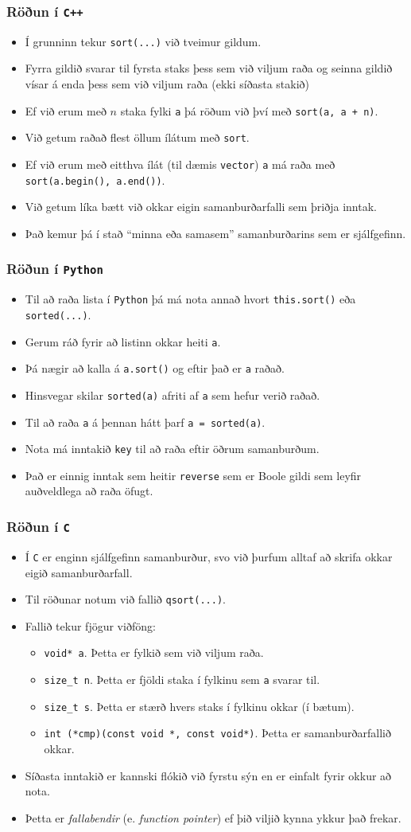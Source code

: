 \documentclass[handout]{beamer}
\newcommand\env[2]
{
	\begin{#1}
	#2
	\end{#1}
}
\begin{document}
\env{frame}
{
	\frametitle{Röðun í \texttt{C++}}
	\env{itemize}
	{
		\item<1-> Í grunninn tekur \texttt{sort(...)} við tveimur gildum.
		\item<2-> Fyrra gildið svarar til fyrsta staks þess sem við viljum raða og seinna gildið vísar á enda þess sem við viljum raða
			(ekki síðasta stakið)
		\item<3-> Ef við erum með $n$ staka fylki \texttt{a} þá röðum við því með \texttt{sort(a, a + n)}.
		\item<4-> Við getum raðað flest öllum ílátum með \texttt{sort}.
		\item<5-> Ef við erum með eitthva ílát (til dæmis \texttt{vector}) \texttt{a} má raða með \texttt{sort(a.begin(), a.end())}.
		\item<6-> Við getum líka bætt við okkar eigin samanburðarfalli sem þriðja inntak.
		\item<7-> Það kemur þá í stað ``minna eða samasem'' samanburðarins sem er sjálfgefinn.
	}
}

\env{frame}
{
	\frametitle{Röðun í \texttt{Python}}
	\env{itemize}
	{
		\item<1-> Til að raða lista í \texttt{Python} þá má nota annað hvort \texttt{this.sort()} eða \texttt{sorted(...)}.
		\item<2-> Gerum ráð fyrir að listinn okkar heiti \texttt{a}.
		\item<3-> Þá nægir að kalla á \texttt{a.sort()} og eftir það er \texttt{a} raðað.
		\item<4-> Hinsvegar skilar \texttt{sorted(a)} afriti af \texttt{a} sem hefur verið raðað.
		\item<5-> Til að raða \texttt{a} á þennan hátt þarf \texttt{a = sorted(a)}.
		\item<6-> Nota má inntakið \texttt{key} til að raða eftir öðrum samanburðum.
		\item<7-> Það er einnig inntak sem heitir \texttt{reverse} sem er Boole gildi sem leyfir auðveldlega að raða öfugt.
	}
}

\env{frame}
{
	\frametitle{Röðun í \texttt{C}}
	\env{itemize}
	{
		\item<1-> Í \texttt{C} er enginn sjálfgefinn samanburður, svo við þurfum alltaf að skrifa okkar eigið samanburðarfall.
		\item<2-> Til röðunar notum við fallið \texttt{qsort(...)}.
		\item<3-> Fallið tekur fjögur viðföng:
		\env{itemize}
		{
			\item<4-> \texttt{void* a}. Þetta er fylkið sem við viljum raða.
			\item<5-> \texttt{size\_t n}. Þetta er fjöldi staka í fylkinu sem \texttt{a} svarar til.
			\item<6-> \texttt{size\_t s}. Þetta er stærð hvers staks í fylkinu okkar (í bætum).
			\item<7-> \texttt{int (*cmp)(const void *, const void*)}. Þetta er samanburðarfallið okkar.
		}
		\item<8-> Síðasta inntakið er kannski flókið við fyrstu sýn en er einfalt fyrir okkur að nota.
		\item<9-> Þetta er \emph{fallabendir} (e. \emph{function pointer}) ef þið viljið kynna ykkur það frekar.
	}
}
\end{document}
